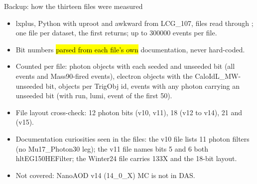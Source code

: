 \begin{frame}{Backup: how the thirteen files were measured}
  \begin{itemize}\small
    \item lxplus, Python with uproot and awkward from LCG\_107, files read through ;
          one file per dataset, the first  returns; up to 300000 events per file.
    \item Bit numbers \hl{parsed from each file's own}  documentation, never hard-coded.
    \item Counted per file: photon objects with each seeded and unseeded bit (all events and Mass90-fired events),
          electron objects with the CaloIdL\_MW-unseeded bit, objects per TrigObj id, events with any photon
          carrying an unseeded bit (with run, lumi, event of the first 50).
    \item File layout cross-check: 12 photon bits (v10, v11), 18 (v12 to v14), 21 and  (v15).
    \item Documentation curiosities seen in the files: the v10 file lists 11 photon filters (no Mu17\_Photon30 leg);
          the v11 file names bits 5 and 6 both hltEG150HEFilter; the Winter24 file carries 133X and the 18-bit layout.
    \item Not covered: NanoAOD v14 (14\_0\_X) MC is not in DAS.
  \end{itemize}
\end{frame}

